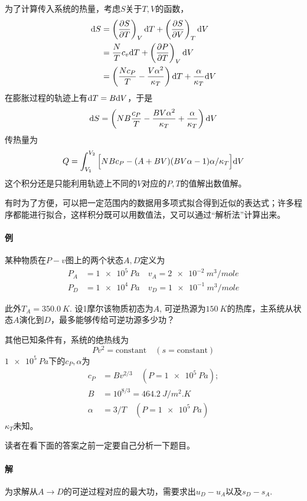 为了计算传入系统的热量，考虑$S$关于$T, V$的函数， 
\begin{align*}
	\mathrm{d} S &= \left( \frac{\partial S}{\partial T} \right)_V \mathrm{d} T + \left( \frac{\partial S}{\partial V} \right)_T \mathrm{d} V \\
	&= \frac{N}{T} c_v \mathrm{d} T + \left( \frac{\partial P}{\partial T} \right)_V \mathrm{d} V \\
	&= \left( \frac{Nc_P}{T} - \frac{V \alpha^2}{\kappa_T} \right) \mathrm{d} T + \frac{\alpha}{\kappa_T} \mathrm{d} V 
\end{align*}
在膨胀过程的轨迹上有$\mathrm{d} T = B \mathrm{d} V$，于是 
\[
	\mathrm{d} S = \left( NB\frac{c_P}{T} - \frac{BV\alpha^2}{\kappa_T} + \frac{\alpha}{\kappa_T} \right) \mathrm{d} V 
\]
传热量为
\[
	Q = \int_{V_1}^{V_2} \Big[ NBc_P - (A + BV)(BV\alpha - 1)\alpha / \kappa_T \Big] \mathrm{d} V 
\]
这个积分还是只能利用轨迹上不同的$V$对应的$P, T$的值解出数值解。

有时为了方便，可以把一定范围内的数据用多项式拟合得到近似的表达式；许多程序都能进行拟合，这样积分既可以用数值法，又可以通过“解析法”计算出来。

\paragraph{例} 某种物质在$P-v$图上的两个状态$A, D$定义为
\begin{align*}
	P_A &= \SI{1e5}{Pa} \quad v_A = \SI{2e-2}{m^3 \per mole} \\
	P_D &= \SI{1e4}{Pa} \quad v_D = \SI{1e-1}{m^3 \per mole}
\end{align*}

此外$T_A = \SI{350.0}{K}$. 设1摩尔该物质初态为$A$, 可逆热源为$\SI{150}{K}$的热库，主系统从状态$A$演化到$D$，最多能够传给可逆功源多少功？

其他已知条件有，系统的绝热线为
\[
	Pv^2 = \text{constant} \quad (s = \text{constant})
\]
$\SI{1e5}{Pa}$下的$c_P, \alpha$为 
\begin{align*}
	c_P &= Bv^{2/3} \quad ( P = \SI{1e5}{Pa}); \\
	B &= 10^{8/3} = \SI{464.2}{J \per m^2.K} \\
	\alpha &= 3/T \quad ( P = \SI{1e5}{Pa})
\end{align*}
$\kappa_T$未知。

读者在看下面的答案之前一定要自己分析一下题目。

\paragraph{解} 为求解从$A \to D$的可逆过程对应的最大功，需要求出$u_D - u_A$以及$s_D - s_A$. 

